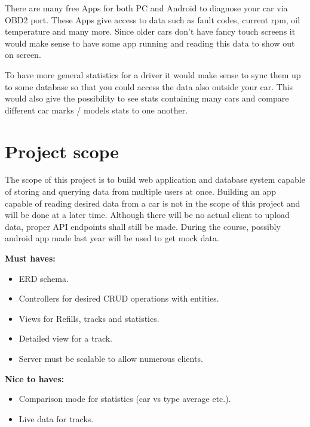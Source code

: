 There are many free Apps for both PC and Android to diagnose your car via OBD2 port.
These Apps give access to data such as fault codes, current rpm, oil temperature and many more.
Since older cars don't have fancy touch screens it would make sense to have some app running and reading this data to show out on screen.

To have more general statistics for a driver it would make sense to sync them up to some database so that you could access the data also outside your car.
This would also give the possibility to see stats containing many cars and compare different car marks / models stats to one another.


\section{Project scope}\label{sec:project-scope}
The scope of this project is to build web application and database system capable of storing and querying data from multiple users at once.
Building an app capable of reading desired data from a car is not in the scope of this project and will be done at a later time.
Although there will be no actual client to upload data, proper API endpoints shall still be made.
During the course, possibly android app made last year will be used to get mock data.

\textbf{Must haves:}
\begin{itemize}
    \item ERD schema.
    \item Controllers for desired CRUD operations with entities.
    \item Views for Refills, tracks and statistics.
    \item Detailed view for a track.
    \item Server must be scalable to allow numerous clients.
\end{itemize}

\textbf{Nice to haves:}
\begin{itemize}
    \item Comparison mode for statistics (car vs type average etc.).
    \item Live data for tracks.
\end{itemize}